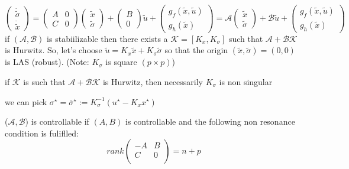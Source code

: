 \documentclass[english]{lectures}
\begin{document}
\[
    \begin{pmatrix}
        \dot{\tilde{\sigma}} \\ \dot{\tilde{x}}
    \end{pmatrix} = \begin{pmatrix}
        A & 0 \\ C & 0
    \end{pmatrix}\begin{pmatrix}
        \tilde{x} \\ \tilde{\sigma}
    \end{pmatrix}+\begin{pmatrix}
        B \\ 0
    \end{pmatrix}\tilde{u} + \begin{pmatrix}
        g_f(\tilde{x},\tilde{u}) \\ g_h(\tilde{x})
    \end{pmatrix}=\mathcal{A}\begin{pmatrix}
        \tilde{x} \\ \tilde{\sigma}
    \end{pmatrix}+\mathcal{B}\tilde{u} + \begin{pmatrix}
        g_f(\tilde{x},\tilde{u}) \\ g_h(\tilde{x})
    \end{pmatrix}
\]
if $(\mathcal{A},\mathcal{B})$ is stabiilizable then there exists a $\mathcal{K}=[K_x,K_\sigma]$ such that $\mathcal{A}+\mathcal{B}\mathcal{K}$ is Hurwitz. So, let's choose $\tilde{u}=K_x\tilde{x}+K_\sigma \tilde{\sigma}$ so that the origin $(\tilde{x},\tilde{\sigma})=(0,0)$ is LAS (robust). (Note: $K_\sigma$ is square $(p \times p)$)
\begin{result}
    if $\mathcal{K}$ is such that $\mathcal{A}+\mathcal{B}\mathcal{K}$ is Hurwitz, then necessarily $K_\sigma$ is non singular
\end{result}

we can pick $\sigma^\star=\bar{\sigma}^\star := K_\sigma^{-1}(u^\star-K_xx^\star)$

\begin{result}
    ($\mathcal{A},\mathcal{B}$) is controllable if $(A,B)$ is controllable and the following non resonance condition is fuliflled:
    \[
        rank\begin{pmatrix}
            -A & B\\
            C &  0\\
        \end{pmatrix}=n+p
    \]
\end{result}
\end{document}
